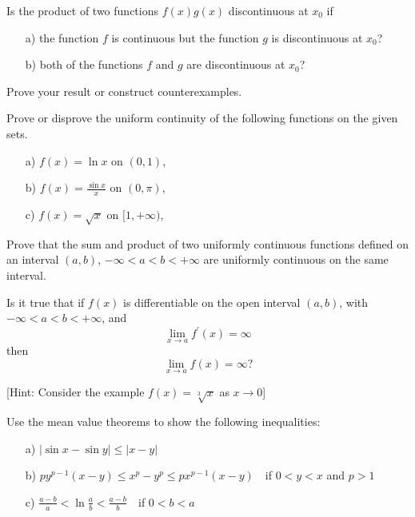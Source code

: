 \documentclass[11pt]{article}%
\begin{document}
\begin{Exercise}[title=*]
	Is the product of two functions $f(x)g(x)$ discontinuous at $x_0$ if 
\begin{itemize}
	\item[a)]{the function $f$ is continuous but the function $g$ is discontinuous at $x_0$?}
	\item[b)]{both of the functions $f$ and $g$ are discontinuous at $x_0$?}
\end{itemize} Prove your result or construct counterexamples.
\end{Exercise}

\begin{Exercise}[title=**]
	Prove or disprove the uniform continuity of the following functions on the given sets.
\begin{itemize}
	\item[a)]{$f(x)=\ln x$ on $(0,1)$,}
	\item[b)]{$f(x)=\frac{\sin x}{x}$ on $(0,\pi)$,}
	\item[c)]{$f(x)=\sqrt x$ on $[1,+\infty)$,}
\end{itemize}
\end{Exercise}

\begin{Exercise}[title=**]
	Prove that the sum and product of two uniformly continuous functions defined on an interval $(a,b)$, $-\infty<a<b<+\infty$ are uniformly continuous on the same interval.
\end{Exercise}

\begin{Exercise}[title=*]
	Is it true that if $f(x)$ is differentiable on the open interval $(a,b)$, with $-\infty<a<b<+\infty$, and $$\lim_{x\to a}f^{\prime}(x)=\infty$$ then $$\lim_{x\to a}f(x)=\infty?$$ 

[Hint: Consider the example $f(x)=\sqrt[3]{x}$ as $x\to 0$]
\end{Exercise}

\begin{Exercise}[title=**]
	Use the mean value theorems to show the following inequalities:
\begin{itemize}
	\item[a)]{$|\sin x-\sin y|\leq |x-y|$}
	\item[b)]{$py^{p-1}(x-y)\leq x^p-y^p\leq px^{p-1}(x-y)$\ \  if $0<y<x$ and $p>1$}
	\item[c)]{$\frac{a-b}{a}<\ln\frac{a}{b}<\frac{a-b}{b}$\ \  if $0<b<a$}
\end{itemize} 
\end{Exercise}
\end{document}

